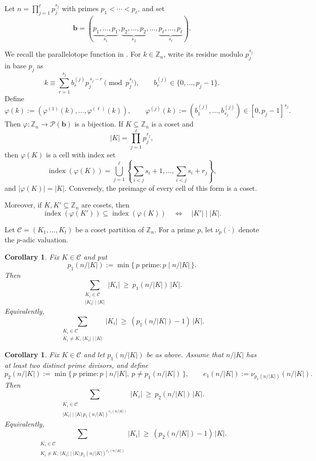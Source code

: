 \documentclass[11pt,reqno]{amsart}
\newtheorem{corollary}[theorem]{Corollary}
\theoremstyle{definition}
\newcommand{\Z}{\mathbb{Z}}
\DeclareMathOperator{\ind}{index}
\begin{document}
Let \(n=\prod_{j=1}^{\ell} p_j^{s_j}\) with primes \(p_1<\cdots<p_\ell\), and set
\[
\mathbf b=(\underbrace{p_1,\dots,p_1}_{s_1},\underbrace{p_2,\dots,p_2}_{s_2},\dots,\underbrace{p_\ell,\dots,p_\ell}_{s_\ell}).
\]

We recall the parallelotope function in \cite{BFF}.
For \(k\in \mathbb Z_n\), write its residue modulo \(p_j^{s_j}\) in base \(p_j\) as
\[
k \equiv \sum_{r=1}^{s_j} b_r^{(j)} p_j^{\,s_j-r}\pmod{p_j^{s_j}},
\qquad
b_r^{(j)}\in\{0,\dots,p_j-1\}.
\]
Define
\[
\varphi(k):=(\varphi^{(1)}(k),\dots,\varphi^{(\ell)}(k)),
\qquad
\varphi^{(j)}(k):=(b_1^{(j)},\dots,b_{s_j}^{(j)})\in [0,p_j-1]^{s_j}.
\]
Then \(\varphi:\mathbb Z_n\to \mathcal P(\mathbf b)\) is a bijection.
If \(K\subseteq \mathbb Z_n\) is a coset and
\[
|K| = \prod_{j=1}^{\ell} p_j^{r_j},
\]
then \(\varphi(K)\) is a cell with index set
\[
\ind(\varphi(K))
=
\bigcup_{j=1}^{\ell}
\left\{
\sum_{i<j} s_i + 1,\dots,\sum_{i<j} s_i + r_j
\right\},
\]
and \(|\varphi(K)|=|K|\). Conversely, the preimage of every cell of this form is a coset.

Moreover, if \(K, K'\subseteq \mathbb Z_n\) are cosets, then
\begin{equation}
\label{eq:index-inclusion}
  \ind(\varphi(K'))\subseteq \ind(\varphi(K))
  \quad\Longleftrightarrow\quad
  |K'|\mid |K|.
\end{equation}

Let \(\mathcal C=(K_1,\dots,K_t)\) be a coset partition of \(\Z_n\). For a prime \(p\), let \(\nu_p(\cdot)\) denote the \(p\)-adic valuation.

\begin{corollary}\label{cor:coset-bff}
Fix \(K\in\mathcal C\) and put
\[
  p_1(n/|K|):=\min\{\,p \text{ prime} : p\mid n/|K|\,\}.
\]
Then
\[
  \sum_{\substack{K_i\in\mathcal C\\ |K_i|\mid |K|}} |K_i|
  \ \ge\ p_1(n/|K|)\,|K|.
\]
Equivalently,
\[
  \sum_{\substack{K_i\in\mathcal C\\ K_i\neq K,\ |K_i|\mid |K|}} |K_i|
  \ \ge\ (p_1(n/|K|)-1)\,|K|.
\]
\end{corollary}

\begin{corollary}\label{cor:coset-twolevel}
Fix \(K\in\mathcal C\) and let \(p_1(n/|K|)\) be as above.
Assume that \(n/|K|\) has at least two distinct prime divisors, and define
\[
  p_2(n/|K|):=\min\{\,p \text{ prime} : p\mid n/|K|,\ p\neq p_1(n/|K|)\,\},
  \qquad
  e_1(n/|K|):=\nu_{p_1(n/|K|)}(n/|K|).
\]
Then
\[
  \sum_{\substack{K_i\in\mathcal C\\ |K_i|\mid |K|\,p_1(n/|K|)^{e_1(n/|K|)}}} |K_i|
  \ \ge\ p_2(n/|K|)\,|K|.
\]
Equivalently,
\[
  \sum_{\substack{K_i\in\mathcal C\\ K_i\neq K,\ |K_i|\mid |K|\,p_1(n/|K|)^{e_1(n/|K|)}}} |K_i|
  \ \ge\ (p_2(n/|K|)-1)\,|K|.
\]
\end{corollary}
\end{document}
